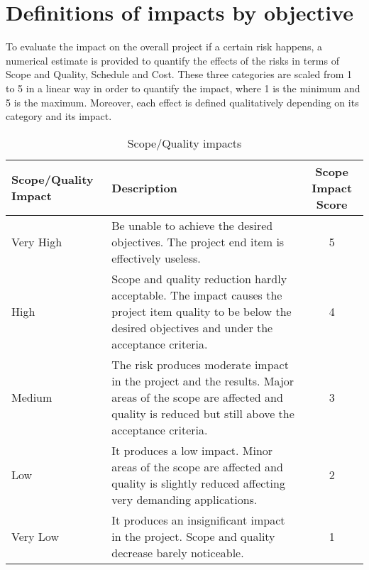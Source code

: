 \section{Definitions of impacts by objective}
\label{3.2}
To evaluate the impact on the overall project if a certain risk happens, a numerical estimate is provided to quantify the effects of the risks in terms of Scope and Quality, Schedule and Cost. These three categories are scaled from 1 to 5 in a linear way in order to quantify the impact, where 1 is the minimum and 5 is the maximum. Moreover, each effect is defined qualitatively depending on its category and its impact. 

\begin{table}[H]
	\centering
	\begin{tabular}{l >{\raggedright\arraybackslash}p{6.3cm} c}
		
		\toprule[2pt]
		
		\textbf{Scope/Quality Impact} &  \textbf{Description}  & \textbf{Scope Impact Score}\\
		
		\midrule [1.5pt]
		
		Very High & Be unable to achieve the desired objectives. The project end item is effectively useless. & 5\vspace{0.2cm} \\
		
		\midrule
		
		High & Scope and quality reduction hardly acceptable. The impact causes the project item quality to be below the desired objectives and under the acceptance criteria. & 4\vspace{0.2cm} \\
		
		\midrule
		
		Medium & The risk produces moderate impact in the project and the results. Major areas of the scope are affected and quality is reduced but still above the acceptance criteria. & 3\vspace{0.2cm} \\
	
		\midrule
	
		Low & It produces a low impact. Minor areas of the scope are affected and quality is slightly reduced affecting very demanding applications. & 2\vspace{0.2cm} \\
	
		\midrule
	
		Very Low & It produces an insignificant impact in the project. Scope and quality decrease barely noticeable. & 1\vspace{0.2cm} \\
			
		\bottomrule[2pt]
		
	\end{tabular}
	\caption{Scope/Quality impacts}
\end{table}
	
